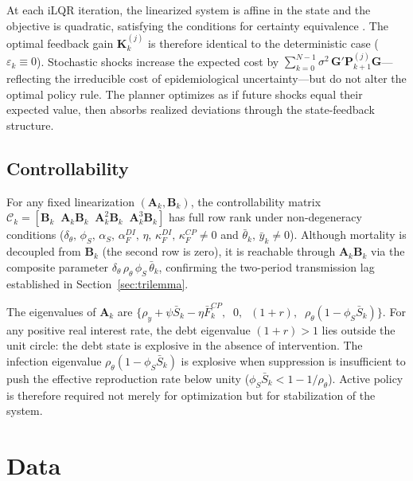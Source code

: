 \documentclass[12pt, a4paper]{article}
\begin{document}
At each iLQR iteration, the linearized system is affine in the state and the
objective is quadratic, satisfying the conditions for certainty equivalence
\citep[Chapter~3.1]{bertsekas2017dynamic}. The optimal feedback gain $\bm{K}_k^{(j)}$
is therefore identical to the deterministic case ($\varepsilon_k \equiv 0$).
Stochastic shocks increase the expected cost by
$\sum_{k=0}^{N-1} \sigma^2\, \bm{G}'\bm{P}_{k+1}^{(j)}\bm{G}$---reflecting the
irreducible cost of epidemiological uncertainty---but do not alter the optimal policy
rule. The planner optimizes as if future shocks equal their expected value, then
absorbs realized deviations through the state-feedback structure.


\subsection{Controllability}
\label{sec:controllability}

For any fixed linearization $(\bm{A}_k, \bm{B}_k)$, the controllability matrix
$\mathcal{C}_k = [\bm{B}_k \;\; \bm{A}_k\bm{B}_k \;\;
\bm{A}_k^2\bm{B}_k \;\; \bm{A}_k^3\bm{B}_k]$ has full row rank under
non-degeneracy conditions ($\delta_\theta,\, \phi_S,\, \alpha_S,\, \alpha_F^{DI},\,
\eta,\, \kappa_F^{DI},\, \kappa_F^{CP} \neq 0$ and $\bar{\theta}_k,\,
\bar{y}_k \neq 0$). Although mortality is decoupled from $\bm{B}_k$ (the second row
is zero), it is reachable through $\bm{A}_k\bm{B}_k$ via the composite parameter
$\delta_\theta\,\rho_\theta\,\phi_S\,\bar{\theta}_k$, confirming the two-period
transmission lag established in Section~\ref{sec:trilemma}.

The eigenvalues of $\bm{A}_k$ are
$\bigl\{\rho_y + \psi\bar{S}_k - \eta\bar{F}_k^{CP},\;\; 0,\;\; (1+r),\;\;
\rho_\theta(1-\phi_S\bar{S}_k)\bigr\}$. For any positive real interest rate, the
debt eigenvalue $(1+r) > 1$ lies outside the unit circle: the debt state is explosive
in the absence of intervention. The infection eigenvalue
$\rho_\theta(1-\phi_S\bar{S}_k)$ is explosive when suppression is insufficient to
push the effective reproduction rate below unity
($\phi_S \bar{S}_k < 1 - 1/\rho_\theta$). Active policy is therefore required not
merely for optimization but for stabilization of the system.

\section{Data}
\label{sec:data}
\end{document}
